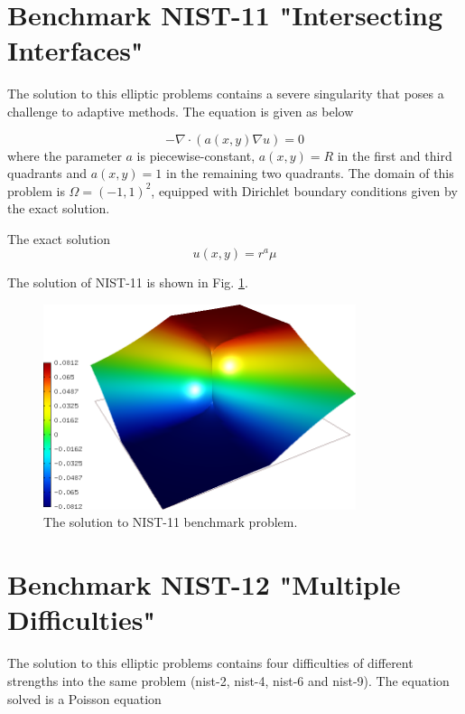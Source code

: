 \documentclass[12pt]{elsarticle}
\begin{document}
\section{Benchmark NIST-11 "Intersecting Interfaces"}
\label{sec:bench-11}

The solution to this elliptic problems contains a severe
singularity that poses a challenge to adaptive methods.
The equation is given as below

\begin{equation} \label{intersecting}
-\nabla \cdot (a(x,y) \nabla u) = 0
\end{equation}
where the parameter $a$ is piecewise-constant,
$a(x,y) = R$ in the first and third quadrants
and $a(x,y) = 1$ in the remaining two quadrants.
The domain of this problem is $\Omega = (-1, 1)^2$, equipped with
Dirichlet boundary conditions given by the exact solution.

The exact solution
\begin{equation}\label{exact-nist-11}
u(x,y) = r^{a} \mu
\end{equation}

The solution of NIST-11 is shown in Fig. \ref{fig:sln-nist11}.

\begin{figure}[!ht]
\centering
\includegraphics[height=6cm]{nist/nist-11/solution.png}
\caption{The solution to NIST-11 benchmark problem.}
\label{fig:sln-nist11}
\end{figure}


\section{Benchmark NIST-12 "Multiple Difficulties"}
\label{sec:bench-12}

The solution to this elliptic problems contains four difficulties
of different strengths into the same problem
(nist-2, nist-4, nist-6 and nist-9).
The equation solved is a Poisson equation
\end{document}
